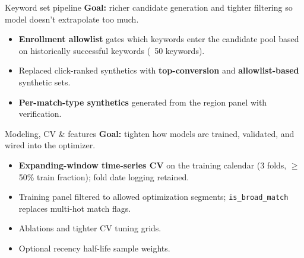 \documentclass[11pt]{beamer}
\begin{document}
\begin{frame}{Keyword set pipeline}
  \textbf{Goal:} richer candidate generation and tighter filtering so model doesn't extrapolate too much.

  \begin{itemize}
    \item \textbf{Enrollment allowlist} gates which keywords enter the candidate pool based on historically successful keywords (~50 keywords).
    \item Replaced click-ranked synthetics with \textbf{top-conversion} and \textbf{allowlist-based} synthetic sets.
    \item \textbf{Per-match-type synthetics} generated from the region panel with verification.
  \end{itemize}
\end{frame}

\begin{frame}{Modeling, CV \& features}
  \footnotesize
  \textbf{Goal:} tighten how models are trained, validated, and wired into the optimizer.

  \begin{itemize}
    \item \textbf{Expanding-window time-series CV} on the training calendar (3 folds, $\geq$50\% train fraction); fold date logging retained.
    \item Training panel filtered to allowed optimization segments; \texttt{is\_broad\_match} replaces multi-hot match flags.
    \item Ablations and tighter CV tuning grids.
    \item Optional recency half-life sample weights.
  \end{itemize}
  \normalsize
\end{frame}
\end{document}
